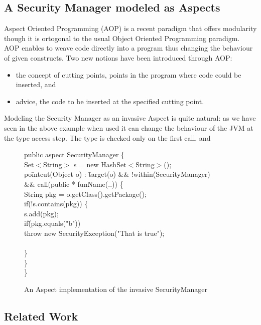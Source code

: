 \documentclass[draft]{llncs}
\begin{document}
\subsection{A Security Manager modeled as Aspects}
Aspect Oriented Programming (AOP) is a recent paradigm that offers modularity
though it is ortogonal to  
the usual Object Oriented Programming paradigm. AOP enables to weave code
directly into a program 
thus changing the behaviour of given constructs. Two new notions have been
introduced through AOP: 
\begin{itemize}
\item the concept of cutting points, points in the program where code could be
inserted, and 
\item advice, the code to be inserted at the specified cutting point.
\end{itemize}

Modeling the Security Manager as an invasive Aspect is quite natural: as we have seen in the above example 
when used it can change the behaviour of the JVM at the type access step. The type is checked only on the
first call, and
%
\begin{figure}
\bcode
pu\=blic aspect SecurityManager \{\+\\

Set$<$String$>$ s = new HashSet$<$String$>$();\\
po\=intcut(Object o) : \=target(o) \&\& !within(SecurityManager)\+ \\
           \>\&\& call(public * funName(..)) \{\\
    String pkg = o.getClass().getPackage();\\
    if\=(!s.contains(pkg)) \{\+\\     
       s.add(pkg);\\
       if\=(pkg.equals("b"))\\
           \>throw new SecurityException("That is true");\\\-\\ 
    \}\-\\
\}\-\\
\}
\ecode
\caption{An Aspect implementation of the invasive SecurityManager}
\end{figure}



\subsection{Related Work}

\end{document}
